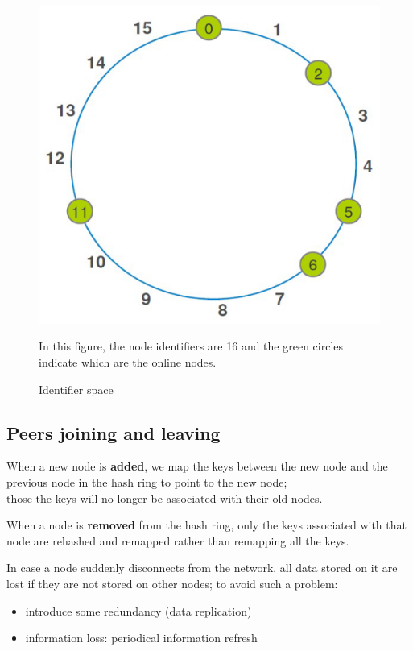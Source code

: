 \begin{paracol}{2}
   \begin{figure}[htbp]
      \centering
      \includegraphics{images/DHT_build1.png}
      \caption{Identifier space}
      In this figure, the node identifiers are 16 and the green circles indicate which are the online nodes.
      \label{fig:DHT_build1}
   \end{figure}
   
\end{paracol}

\subsection{Peers joining and leaving}
When a new node is \textbf{added}, we map the keys between the new node and the previous node in the hash ring to point to the new node;\\
those the keys will no longer be associated with their old nodes.

When a node is \textbf{removed} from the hash ring, only the keys associated with that node are rehashed and remapped rather than remapping all the keys.

In case a node suddenly disconnects from the network, all data stored on it are lost if they are not stored on other nodes;
to avoid such a problem:
\begin{itemize}
   \item introduce some redundancy (data replication)
   \item information loss: periodical information refresh
\end{itemize}

